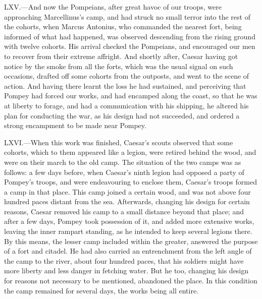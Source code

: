 LXV.—And now the Pompeians, after great havoc of our troops, were
approaching Marcellinus's camp, and had struck no small terror into the
rest of the cohorts, when Marcus Antonius, who commanded the nearest
fort, being informed of what had happened, was observed descending from
the rising ground with twelve cohorts. His arrival checked the
Pompeians, and encouraged our men to recover from their extreme
affright. And shortly after, Caesar having got notice by the smoke from
all the forts, which was the usual signal on such occasions, drafted off
some cohorts from the outposts, and went to the scene of action. And
having there learnt the loss he had sustained, and perceiving that
Pompey had forced our works, and had encamped along the coast, so that
he was at liberty to forage, and had a communication with his shipping,
he altered his plan for conducting the war, as his design had not
succeeded, and ordered a strong encampment to be made near Pompey.

LXVI.—When this work was finished, Caesar's scouts observed that some
cohorts, which to them appeared like a legion, were retired behind the
wood, and were on their march to the old camp. The situation of the two
camps was as follows: a few days before, when Caesar's ninth legion had
opposed a party of Pompey's troops, and were endeavouring to enclose
them, Caesar's troops formed a camp in that place. This camp joined a
certain wood, and was not above four hundred paces distant from the sea.
Afterwards, changing his design for certain reasons, Caesar removed his
camp to a small distance beyond that place; and after a few days, Pompey
took possession of it, and added more extensive works, leaving the inner
rampart standing, as he intended to keep several legions there. By this
means, the lesser camp included within the greater, answered the purpose
of a fort and citadel. He had also carried an entrenchment from the left
angle of the camp to the river, about four hundred paces, that his
soldiers might have more liberty and less danger in fetching water. But
he too, changing his design for reasons not necessary to be mentioned,
abandoned the place. In this condition the camp remained for several
days, the works being all entire.

